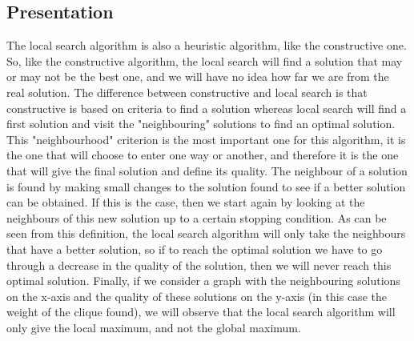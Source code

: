 
\subsection{Presentation}

The local search algorithm is also a heuristic algorithm, like the constructive one. 
So, like the constructive algorithm, the local search will find a solution that may 
or may not be the best one, and we will have no idea how far we are from the real 
solution. The difference between constructive and local search is that constructive 
is based on criteria to find a solution whereas local search will find a first 
solution and visit the "neighbouring" solutions to find an optimal solution. This 
"neighbourhood" criterion is the most important one for this algorithm, it is the 
one that will choose to enter one way or another, and therefore it is the one that 
will give the final solution and define its quality. The neighbour of a solution is 
found by making small changes to the solution found to see if a better solution can 
be obtained. If this is the case, then we start again by looking at the neighbours 
of this new solution up to a certain stopping condition. As can be seen from this 
definition, the local search algorithm will only take the neighbours that have a 
better solution, so if to reach the optimal solution we have to go through a decrease 
in the quality of the solution, then we will never reach this optimal solution. 
Finally, if we consider a graph with the neighbouring solutions on the x-axis and 
the quality of these solutions on the y-axis (in this case the weight of the clique 
found), we will observe that the local search algorithm will only give the local 
maximum, and not the global maximum.


\begin{center}
\end{center}

